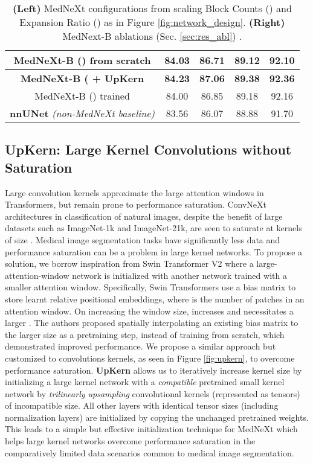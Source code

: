 \documentclass[runningheads]{llncs}
\begin{document}
\begin{table}[t]
\begin{adjustbox}{width=0.56\textwidth}
\begin{tabular}{|c||cc|cc|}
        MedNeXt-B () from scratch & \multicolumn{1}{c|}{84.03} & 86.71 & \multicolumn{1}{c|}{89.12} & 92.10 \\ \hline \hline
        \textbf{MedNeXt-B ( + UpKern} & \multicolumn{1}{c|}{\textbf{84.23}} & \textbf{87.06} & \multicolumn{1}{c|}{\textbf{89.38}} & \textbf{92.36} \\ \hline
        MedNeXt-B () trained  & \multicolumn{1}{c|}{84.00} & 86.85 & \multicolumn{1}{c|}{89.18} & 92.16 \\ \hline \hline
        \textbf{nnUNet} \textit{(non-MedNeXt baseline)} & \multicolumn{1}{c|}{83.56} & 86.07 & \multicolumn{1}{c|}{88.88} & 91.70 \\ \hline
\end{tabular}
    \end{adjustbox}
    \caption{\textbf{(Left)} MedNeXt configurations from scaling Block Counts () and Expansion Ratio () as in Figure \ref{fig:network_design}. \textbf{(Right)} MedNext-B ablations (Sec. \ref{sec:res_abl}) .\label{tab:configs_and_ablation}}
\end{table}  

\subsection{UpKern: Large Kernel Convolutions without Saturation}
\label{sec:upkern}
Large convolution kernels approximate the large attention windows in Transformers, but remain prone to performance saturation. ConvNeXt architectures in classification of natural images, despite the benefit of large datasets such as ImageNet-1k and ImageNet-21k, are seen to saturate at kernels of size  \cite{liu2022convnet}. 
Medical image segmentation tasks have significantly less data and performance saturation can be a problem in large kernel networks. 
To propose a solution, we borrow inspiration from Swin Transformer V2 \cite{liu2022swin} where a large-attention-window network is initialized with another network trained with a smaller attention window. Specifically, Swin Transformers use a bias matrix  to store learnt relative positional embeddings, where  is the number of patches in an attention window. On increasing the window size,  increases and necessitates a larger . The authors proposed spatially interpolating an existing bias matrix to the larger size as a pretraining step, instead of training from scratch, which demonstrated improved performance. We propose a similar approach but customized to convolutions kernels, as seen in Figure \ref{fig:upkern}, to overcome performance saturation. \textbf{UpKern} allows us to iteratively increase kernel size by initializing a large kernel network with a \textit{compatible} pretrained small kernel network by \textit{trilinearly upsampling} convolutional kernels (represented as tensors) of incompatible size. All other layers with identical tensor sizes (including normalization layers) are initialized by copying the unchanged pretrained weights. This leads to a simple but effective initialization technique for MedNeXt which helps large kernel networks overcome performance saturation in the comparatively limited data scenarios common to medical image segmentation.
\end{document}
